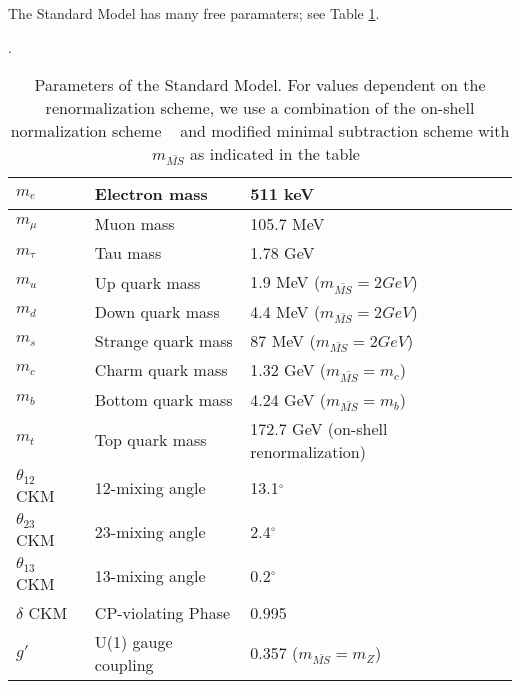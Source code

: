 The Standard Model has many free paramaters; see Table \ref{tab:sm_free_parameters}.
\begin{table}
\centering
\caption{Parameters of the Standard Model.  For values dependent on the renormalization scheme, we use a combination of the on-shell normalization scheme ~\cite{Hollik:1988ii, Bardin:1989vz, Kennedy:1988rt, Sirlin:1980nh} and  modified minimal subtraction scheme with $m_{\bar{MS}}$ as indicated in the table~\cite{ Fanchiotti:1992tu}}.
\label{tab:sm_free_parameters}
\begin{tabular}{| l | l | l |}
\hline
$m_e$             & Electron mass                  & 511 keV                           \\ \hline
$m_\mu$           & Muon mass                      & 105.7 MeV                         \\ \hline
$m_\tau$          & Tau mass                       & 1.78 GeV                          \\ \hline
$m_u$             & Up quark mass                  & 1.9 MeV   ($m_{\bar{MS}} = 2 GeV$)                        \\ \hline
$m_d$             & Down quark mass                & 4.4 MeV   ($m_{\bar{MS}} = 2 GeV$)                       \\ \hline
$m_s$             & Strange quark mass             & 87 MeV    ($m_{\bar{MS}} = 2 GeV$)                        \\ \hline
$m_c$             & Charm quark mass               & 1.32 GeV  ($m_{\bar{MS}} = m_c$)                        \\ \hline
$m_b$             & Bottom quark mass              & 4.24 GeV  ($m_{\bar{MS}} = m_b$)  \\ \hline
$m_t$             & Top quark mass                 & 172.7 GeV (on-shell renormalization)                       \\ \hline
$\theta_{12}$ CKM & 12-mixing angle                & 13.1$^{\circ}$                    \\ \hline
$\theta_{23}$ CKM & 23-mixing angle                & 2.4$^{\circ}$                     \\ \hline
$\theta_{13}$ CKM & 13-mixing angle                & 0.2$^{\circ}$                     \\ \hline
$\delta$ CKM      & CP-violating Phase             & 0.995                             \\ \hline
$g'$              & U(1) gauge coupling            & 0.357     ($m_{\bar{MS}} = m_Z$)                         \\ \hline

\end{tabular}
\end{table}
